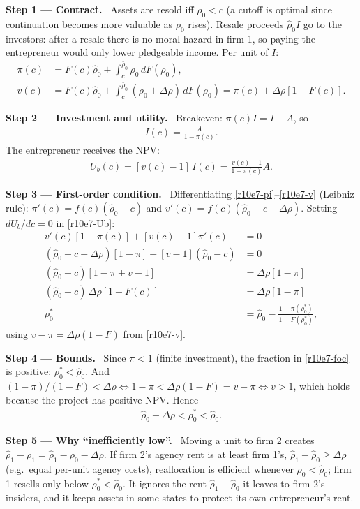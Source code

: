 \documentclass[11pt,a4paper]{article}
\newcommand{\step}[2]{\par\medskip\noindent\textbf{Step #1 --- #2.}~}
\begin{document}
\step{1}{Contract} Assets are resold iff $\rho_0<c$ (a cutoff is optimal since continuation becomes more valuable as $\rho_0$ rises). Resale proceeds $\hat\rho_0I$ go to the investors: after a resale there is no moral hazard in firm 1, so paying the entrepreneur would only lower pledgeable income. Per unit of $I$:
\begin{align}
  \pi(c) &= F(c)\hat\rho_0+\int_c^{\bar\rho_0}\rho_0\,dF(\rho_0), \label{r10e7-pi}\\
  v(c) &= F(c)\hat\rho_0+\int_c^{\bar\rho_0}(\rho_0+\Delta\rho)\,dF(\rho_0) = \pi(c)+\Delta\rho[1-F(c)]. \label{r10e7-v}
\end{align}

\step{2}{Investment and utility} Breakeven: $\pi(c)I=I-A$, so
\begin{align}
  I(c) = \frac{A}{1-\pi(c)}. \label{r10e7-I}
\end{align}
The entrepreneur receives the NPV:
\begin{align}
  U_b(c) = [v(c)-1]\,I(c) = \frac{v(c)-1}{1-\pi(c)}A. \label{r10e7-Ub}
\end{align}

\step{3}{First-order condition} Differentiating \eqref{r10e7-pi}--\eqref{r10e7-v} (Leibniz rule): $\pi'(c)=f(c)(\hat\rho_0-c)$ and $v'(c)=f(c)(\hat\rho_0-c-\Delta\rho)$. Setting $dU_b/dc=0$ in \eqref{r10e7-Ub}:
\begin{align}
  v'(c)[1-\pi(c)]+[v(c)-1]\pi'(c) &= 0 \nonumber\\
  (\hat\rho_0-c-\Delta\rho)[1-\pi]+[v-1](\hat\rho_0-c) &= 0 \nonumber\\
  (\hat\rho_0-c)[1-\pi+v-1] &= \Delta\rho[1-\pi] \nonumber\\
  (\hat\rho_0-c)\,\Delta\rho[1-F(c)] &= \Delta\rho[1-\pi] \nonumber\\
  \rho_0^* &= \hat\rho_0-\frac{1-\pi(\rho_0^*)}{1-F(\rho_0^*)}, \label{r10e7-foc}
\end{align}
using $v-\pi=\Delta\rho(1-F)$ from \eqref{r10e7-v}.

\step{4}{Bounds} Since $\pi<1$ (finite investment), the fraction in \eqref{r10e7-foc} is positive: $\rho_0^*<\hat\rho_0$. And $(1-\pi)/(1-F)<\Delta\rho\iff1-\pi<\Delta\rho(1-F)=v-\pi\iff v>1$, which holds because the project has positive NPV. Hence
\begin{align}
  \hat\rho_0-\Delta\rho<\rho_0^*<\hat\rho_0. \label{r10e7-bounds}
\end{align}

\step{5}{Why ``inefficiently low''} Moving a unit to firm 2 creates $\hat\rho_1-\rho_1=\hat\rho_1-\rho_0-\Delta\rho$. If firm 2's agency rent is at least firm 1's, $\hat\rho_1-\hat\rho_0\geq\Delta\rho$ (e.g.\ equal per-unit agency costs), reallocation is efficient whenever $\rho_0<\hat\rho_0$; firm 1 resells only below $\rho_0^*<\hat\rho_0$. It ignores the rent $\hat\rho_1-\hat\rho_0$ it leaves to firm 2's insiders, and it keeps assets in some states to protect its own entrepreneur's rent.
\end{document}

